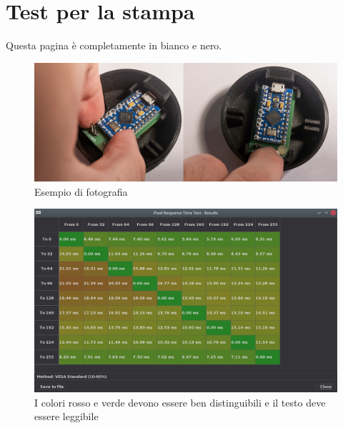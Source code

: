 \documentclass[12pt,a4paper]{report}
\begin{document}
	\sloppy
	\setlength{\parskip}{10pt}
	\setlength{\parindent}{0pt}
	
	\chapter{Test per la stampa}
	Questa pagina è completamente in bianco e nero.

	\lipsum[1-4]
	\begin{figure}[H]
		\centering
		\includegraphics[width=\textwidth]{Dispositivo_files/assembly_14.jpg}
		\caption{Esempio di fotografia}
		\label{fig:photo1}
	\end{figure}
	\begin{figure}[H]
		\centering
		\includegraphics[width=\textwidth]{Applicazione_files/gui_pixelresponse_results.png}
		\caption{I colori rosso e verde devono essere ben distinguibili e il testo deve essere leggibile}
		\label{fig:screen1}
	\end{figure}
\end{document}
